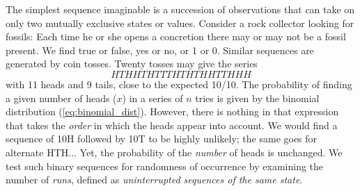 	The simplest sequence imaginable is a succession of observations that can take on only two 
mutually exclusive states or values.  Consider a rock collector looking for fossils:  Each time he 
or she opens a concretion there may or may not be a fossil present.  We find true or false, 
yes or no, or 1 or 0.  Similar sequences are generated by coin tosses.  Twenty tosses may give the 
series
\begin{equation}
HTHHTHTTTHTHTHHTTHHH
\label{eq:heads}
\end{equation}
with 11 heads and 9 tails, close to the expected 10/10.  The probability of finding a given number 
of heads ($x$) in a series of $n$ tries is given by the binomial distribution (\ref{eq:binomial_dist}).
However, there is nothing in that expression that takes the \emph{order} in which the heads appear into account.  We would find 
a sequence of 10H followed by 10T to be highly unlikely; the same goes for alternate HTH...  Yet, the 
probability of the \emph{number} of heads is unchanged.  We test such binary sequences for randomness 
of occurrence by examining the number of \emph{runs}, defined as \emph{uninterrupted sequences of the same 
state}.
